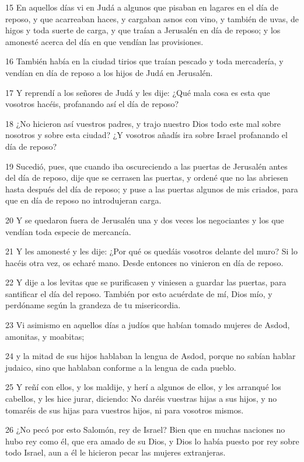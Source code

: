 \par 15 En aquellos días vi en Judá a algunos que pisaban en lagares en el día de reposo, y que acarreaban haces, y cargaban asnos con vino, y también de uvas, de higos y toda suerte de carga, y que traían a Jerusalén en día de reposo; y los amonesté acerca del día en que vendían las provisiones.
\par 16 También había en la ciudad tirios que traían pescado y toda mercadería, y vendían en día de reposo a los hijos de Judá en Jerusalén. 
\par 17 Y reprendí a los señores de Judá y les dije: ¿Qué mala cosa es esta que vosotros hacéis, profanando así el día de reposo?
\par 18 ¿No hicieron así vuestros padres, y trajo nuestro Dios todo este mal sobre nosotros y sobre esta ciudad? ¿Y vosotros añadís ira sobre Israel profanando el día de reposo?
\par 19 Sucedió, pues, que cuando iba oscureciendo a las puertas de Jerusalén antes del día de reposo, dije que se cerrasen las puertas, y ordené que no las abriesen hasta después del día de reposo; y puse a las puertas algunos de mis criados, para que en día de reposo no introdujeran carga.
\par 20 Y se quedaron fuera de Jerusalén una y dos veces los negociantes y los que vendían toda especie de mercancía.
\par 21 Y les amonesté y les dije: ¿Por qué os quedáis vosotros delante del muro? Si lo hacéis otra vez, os echaré mano. Desde entonces no vinieron en día de reposo.
\par 22 Y dije a los levitas que se purificasen y viniesen a guardar las puertas, para santificar el día del reposo. También por esto acuérdate de mí, Dios mío, y perdóname según la grandeza de tu misericordia.
\par 23 Vi asimismo en aquellos días a judíos que habían tomado mujeres de Asdod, amonitas, y moabitas;
\par 24 y la mitad de sus hijos hablaban la lengua de Asdod, porque no sabían hablar judaico, sino que hablaban conforme a la lengua de cada pueblo.
\par 25 Y reñí con ellos, y los maldije, y herí a algunos de ellos, y les arranqué los cabellos, y les hice jurar, diciendo: No daréis vuestras hijas a sus hijos, y no tomaréis de sus hijas para vuestros hijos, ni para vosotros mismos. 
\par 26 ¿No pecó por esto Salomón, rey de Israel? Bien que en muchas naciones no hubo rey como él, que era amado de su Dios, y Dios lo había puesto por rey sobre todo Israel, aun a él le hicieron pecar las mujeres extranjeras. 
